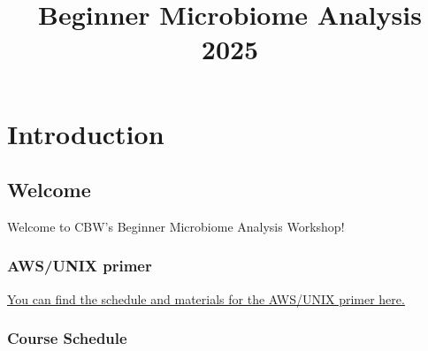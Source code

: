 \documentclass[
]{book}
\title{Beginner Microbiome Analysis 2025}
\author{}
\date{\vspace{-2.5em}}
\begin{document}
\maketitle

{
\setcounter{tocdepth}{1}
\tableofcontents
}
\part{Introduction}\label{part-introduction}

\chapter{Welcome}\label{welcome}

Welcome to CBW's Beginner Microbiome Analysis Workshop!

\section{AWS/UNIX primer}\label{awsunix-primer}

\href{https://bioinformaticsdotca.github.io/AWS_2025}{You can find the schedule and materials for the AWS/UNIX primer here.}

\section{Course Schedule}\label{course-schedule}
\end{document}
